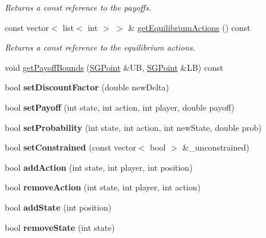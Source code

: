 \begin{DoxyCompactItemize}
\begin{DoxyCompactList}\small\item\em Returns a const reference to the payoffs. \end{DoxyCompactList}\item 
\hypertarget{classSGGame_abece2e37a86662508b4b69299f0173de}{const vector$<$ list$<$ int $>$ $>$ \& \hyperlink{classSGGame_abece2e37a86662508b4b69299f0173de}{get\-Equilibrium\-Actions} () const }\label{classSGGame_abece2e37a86662508b4b69299f0173de}

\begin{DoxyCompactList}\small\item\em Returns a const reference to the equilibrium actions. \end{DoxyCompactList}\item 
void \hyperlink{classSGGame_aa351e7fb094dfc40ef6faba3fb5d5efc}{get\-Payoff\-Bounds} (\hyperlink{classSGPoint}{S\-G\-Point} \&U\-B, \hyperlink{classSGPoint}{S\-G\-Point} \&L\-B) const 
\item 
\hypertarget{classSGGame_ad5879878c647da7040940469b56b9595}{bool {\bfseries set\-Discount\-Factor} (double new\-Delta)}\label{classSGGame_ad5879878c647da7040940469b56b9595}

\item 
\hypertarget{classSGGame_a36b2269c87d27ab3e0278ad44b6bbddc}{bool {\bfseries set\-Payoff} (int state, int action, int player, double payoff)}\label{classSGGame_a36b2269c87d27ab3e0278ad44b6bbddc}

\item 
\hypertarget{classSGGame_afcc31eacca8f294d349905d52c9a5f64}{bool {\bfseries set\-Probability} (int state, int action, int new\-State, double prob)}\label{classSGGame_afcc31eacca8f294d349905d52c9a5f64}

\item 
\hypertarget{classSGGame_a5526a6eb4c4fbb9bc6ff3334e411fbf1}{bool {\bfseries set\-Constrained} (const vector$<$ bool $>$ \&\-\_\-unconstrained)}\label{classSGGame_a5526a6eb4c4fbb9bc6ff3334e411fbf1}

\item 
\hypertarget{classSGGame_a2b3ddf3f5dfca8514cba1933205c5ec3}{bool {\bfseries add\-Action} (int state, int player, int position)}\label{classSGGame_a2b3ddf3f5dfca8514cba1933205c5ec3}

\item 
\hypertarget{classSGGame_a97999290a05ab0427fd36d0a2a737944}{bool {\bfseries remove\-Action} (int state, int player, int action)}\label{classSGGame_a97999290a05ab0427fd36d0a2a737944}

\item 
\hypertarget{classSGGame_a0e4ea56b9e9787dca697782cbedc76d6}{bool {\bfseries add\-State} (int position)}\label{classSGGame_a0e4ea56b9e9787dca697782cbedc76d6}

\item 
\hypertarget{classSGGame_ae4930c4311ee2f7a814400e3e50123a8}{bool {\bfseries remove\-State} (int state)}\label{classSGGame_ae4930c4311ee2f7a814400e3e50123a8}

\end{DoxyCompactItemize}
